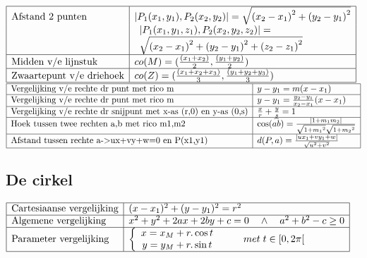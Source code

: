 \documentclass[a5paper]{article}
\begin{document}
$
\begin{array}{|l|l|}
\hline
\text{Afstand 2 punten} & \left| {{P_1}({x_1},{y_1}),{P_2}({x_2},{y_2})} \right| = \sqrt {{{({x_2} - {x_1})}^2} + {{({y_2} - {y_1})}^2}}  \\
 & \begin{array}{l}
\left| {{P_1}({x_1},{y_1},{z_1}),{P_2}({x_2},{y_2},{z_2})} \right| = \\
\sqrt {{{({x_2} - {x_1})}^2} + {{({y_2} - {y_1})}^2} + {{({z_2} - {z_1})}^2}} 
\end{array} \\
\hline
\text{Midden v/e lijnstuk} & co(M) = (\frac{{({x_1} + {x_2})}}{2},\frac{{({y_1} + {y_2})}}{2})\\
\hline
\text{Zwaartepunt v/e driehoek} & co(Z) = (\frac{{({x_1} + {x_2} + {x_3})}}{3},\frac{{({y_1} + {y_2} + {y_3})}}{3})\\
\hline
\end{array}
$
\newline
$
\begin{array}{|l|l|}
\hline
\text{Vergelijking v/e rechte dr punt met rico m} & y - {y_1} = m(x - {x_1})  \\
\hline
\text{Vergelijking v/e rechte dr punt met rico m} & y - {y_1} = \frac{{{y_2} - {y_1}}}{{{x_2} - {x_1}}}(x - {x_1})  \\
\hline
\text{Vergelijking v/e rechte dr snijpunt met x-as (r,0) en y-as (0,s)} & \frac{x}{r} + \frac{y}{s} = 1  \\
\hline
\text{Hoek tussen twee rechten a,b met rico m1,m2} & \cos (\widehat {ab}) = \frac{{\left| {1 + {m_1}{m_2}} \right|}}{{\sqrt {1 + {m_1}^2} \sqrt {1 + {m_2}^2} }}  \\
\hline
\text{Afstand tussen rechte a->ux+vy+w=0 en P(x1,y1)} & d(P,a) = \frac{{\left| {u{x_1} + v{y_1} + w} \right|}}{{\sqrt {{u^2} + {v^2}} }}  \\
\hline
\end{array}
$

\subsection{De cirkel}

$
\begin{array}{|l|l|}
\hline
\text{Cartesiaanse vergelijking} & {(x - {x_1})^2} + {(y - {y_1})^2} = {r^2}  \\
\hline
\text{Algemene vergelijking} & {x^2} + {y^2} + 2ax + 2by + c = 0\quad  \wedge \quad {a^2} + {b^2} - c \ge 0  \\
\hline
\text{Parameter vergelijking} & \left\{ {\begin{array}{*{20}{c}}
{x = {x_M} + r.\cos t}\\
{y = {y_M} + r.\sin t}
\end{array}} \right.\;\quad \quad met\;t \in \left[ {0,2\pi } \right[  \\
\hline
\end{array}
$
\end{document}
